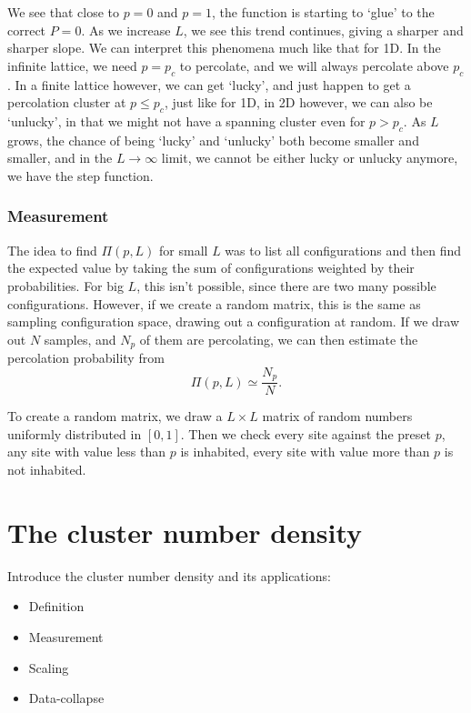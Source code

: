 \documentclass[a4paper, 11pt, notitlepage, english]{article}
\begin{document}
We see that close to $p=0$ and $p=1$, the function is starting to `glue' to the correct $P=0$. As we increase $L$, we see this trend continues, giving a sharper and sharper slope. We can interpret this phenomena much like that for 1D. In the infinite lattice, we need $p=p_c$ to percolate, and we will always percolate above $p_c$. In a finite lattice however, we can get `lucky', and just happen to get a percolation cluster at $p \leq p_c$, just like for 1D, in 2D however, we can also be `unlucky', in that we might not have a spanning cluster even for $p > p_c$. As $L$ grows, the chance of being `lucky' and `unlucky' both become smaller and smaller, and in the $L\to \infty$ limit, we cannot be either lucky or unlucky anymore, we have the step function.


\subsubsection*{Measurement}

The idea to find $\Pi(p, L)$ for small $L$ was to list all configurations and then find the expected value by taking the sum of configurations weighted by their probabilities. For big $L$, this isn't possible, since there are two many possible configurations. However, if we create a random matrix, this is the same as sampling configuration space, drawing out a configuration at random. If we draw out $N$ samples, and $N_p$ of them are percolating, we can then estimate the percolation probability from
$$\Pi(p, L) \simeq \frac{N_p}{N}.$$

To create a random matrix, we draw a $L\times L$ matrix of random numbers uniformly distributed in $[0,1]$. Then we check every site against the preset $p$, any site with value less than $p$ is inhabited, every site with value more than $p$ is not inhabited.
 

\clearpage


\section{The cluster number density}
Introduce the cluster number density and its applications: 
\begin{itemize}
	\item Definition
	\item Measurement
	\item Scaling
	\item Data-collapse
\end{itemize}
\end{document}
